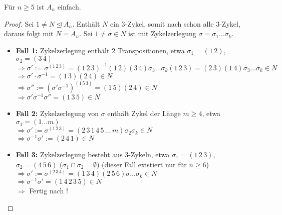\begin{theorem}
	Für $n\geq 5$ ist $A_n$ einfach.
\end{theorem}
\begin{proof}
	Sei $1 \neq N \unlhd A_n$. Enthält $N$ ein $3$-Zykel, somit nach  schon alle $3$-Zykel, daraus folgt mit  $N = A_n$. Sei $1 \neq \sigma \in N$ ist mit Zykelzerlegung $\sigma = \sigma_1\dots \sigma_k$.
	\begin{itemize}
		\item \textbf{Fall 1:} Zykelzerlegung enthält 2 Transpositionen, etwa $\sigma_1 = (1\, 2)$, $\sigma_2 = (3\, 4)$\\
		$\Rightarrow \sigma' := \sigma^{(1\, 2\, 3)} = (1\, 2\, 3)^{-1}(1\, 2)(3\, 4)\sigma_3\dots\sigma_k(1\, 2\, 3) = (2\, 3)(1\, 4)\sigma_3\dots\sigma_k \in N$\\
		$\Rightarrow \sigma'\cdot\sigma^{-1} = (1\, 3)(2\, 4) \in N$\\
		$\Rightarrow \sigma'' := (\sigma'\sigma^{-1})^{(1\, 5\, 3)} = (1\, 5)(2\, 4) \in N$\\
		$\Rightarrow \sigma'\sigma^{-1}\sigma''= (1\, 3\, 5) \in N$
		\item \textbf{Fall 2:} Zykelzerlegung von $\sigma$ enthält Zykel der Länge $m \geq 4$, etwa $\sigma_1 = (1\dots m)$\\
		$\Rightarrow \sigma':=\sigma^{(1\, 2\, 3)} = (2\, 3\, 1\, 4\, 5\, \dots\,  m)\sigma_2\sigma_k \in N$\\
		$\Rightarrow \sigma^{-1}\sigma' :=(2\, 4\, 1)\in N$
		\item \textbf{Fall 3:} Zykelzerlegung besteht aus $3$-Zykeln, etwa $\sigma_1 = (1\, 2\, 3)$, $\sigma_2=(4\, 5\, 6)$ ($\sigma_1 \cap \sigma_2 = \emptyset$) (dieser Fall existiert nur für $n \geq 6$)\\
		$\Rightarrow \sigma' := \sigma^{(2\, 3\, 4)} = (1\, 3\, 4)(2\, 5\, 6)\sigma\dots\sigma_k \in N$\\
		$\Rightarrow \sigma^{-1}\sigma' = (1\, 4\, 2\, 3\, 5) \in N$\\
		$\Rightarrow$ Fertig nach !
	\end{itemize} 
\end{proof}

